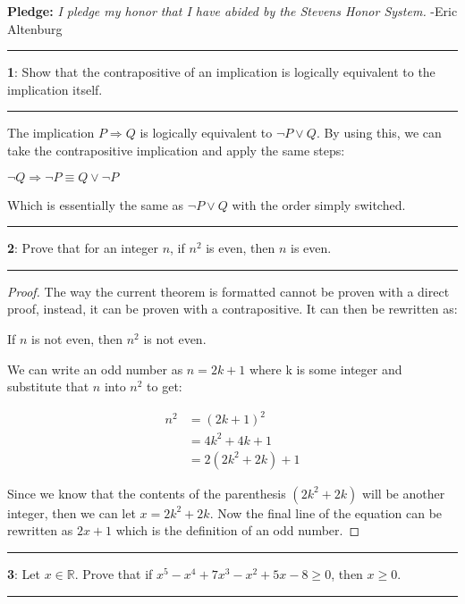 \documentclass[11pt]{article}
\newcommand\question[2]{\vspace{.25in}\hrule\textbf{#1}: #2\vspace{.5em}\hrule\vspace{.10in}}
\newcommand{\R}{\mathbb{R}}
\begin{document}
\raggedright
\newcommand\NAME{Eric Altenburg}  %
\newcommand\COURSE{MA-240}
\newcommand\HWNUM{2}              %


\textbf{Pledge:} \textit{I pledge my honor that I have abided by the Stevens Honor System.} -Eric Altenburg

\question{1}{Show that the contrapositive of an implication is logically equivalent to the implication itself.}

The implication $P \Rightarrow Q$ is logically equivalent to $\lnot P \lor Q$. By using this, we can take the contrapositive implication and apply the same steps:

$\lnot Q \Rightarrow \lnot P \equiv Q \lor \lnot P$ 

Which is essentially the same as $\lnot P \lor Q$ with the order simply switched. 

\question{2}{Prove that for an integer $n$, if $n^2$ is even, then $n$ is even.}

\begin{proof}
	The way the current theorem is formatted cannot be proven with a direct proof, instead, it can be proven with a contrapositive. It can then be rewritten as:

	If $n$ is not even, then $n^2$ is not even. 

	We can write an odd number as $n=2k+1$ where k is some integer and substitute that $n$ into $n^2$ to get:

	\begin{align*}
		n^2 &= (2k+1)^2\\
		&= 4k^2 + 4k + 1\\
		&= 2(2k^2 + 2k) + 1
	\end{align*}

	Since we know that the contents of the parenthesis $(2k^2 + 2k)$ will be another integer, then we can let $x = 2k^2 + 2k$. Now the final line of the equation can be rewritten as $2x + 1$ which is the definition of an odd number.
\end{proof}

\question{3}{Let $x \in \R$. Prove that if $x^5-x^4+7x^3-x^2+5x-8 \ge 0$, then $x \ge 0$.}
\end{document}
